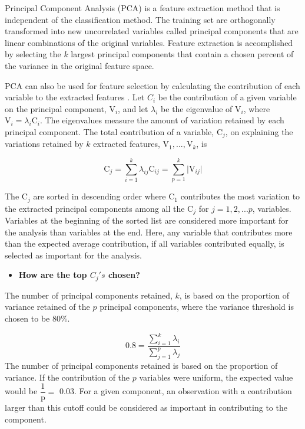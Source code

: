 \documentclass[12pt,]{article}
\providecommand{\tightlist}{%
  \setlength{\itemsep}{0pt}\setlength{\parskip}{0pt}}
\begin{document}
Principal Component Analysis (PCA) \autocite{f.r.s_liii._1901} is a
feature extraction method that is independent of the classification
method. The training set are orthogonally transformed into new
uncorrelated variables called principal components that are linear
combinations of the original variables. Feature extraction is
accomplished by selecting the \(k\) largest principal components that
contain a chosen percent of the variance in the original feature space.

PCA can also be used for feature selection by calculating the
contribution of each variable to the extracted features
\autocite{song_feature_2010}. Let \(C_i\) be the contribution of a given
variable on the principal component, \(\text{V}_i\), and let
\(\lambda_i\) be the eigenvalue of \(\text{V}_i\), where
\(\text{V}_{i} = \lambda_i \text{C}_i\). The eigenvalues measure the
amount of variation retained by each principal component. The total
contribution of a variable, \(\text{C}_j\), on explaining the variations
retained by \(k\) extracted features, \(\text{V}_1, ..., \text{V}_k\),
is

\[
\text{C}_j = \sum^k_{i=1}\lambda_{ij} \text{C}_{ij} = \sum^k_{p=1} \vert \text{V}_{ij} \vert 
\]

The \(\text{C}_j\) are sorted in descending order where \(\text{C}_1\)
contributes the most variation to the extracted principal components
among all the \(\text{C}_j\) for \(j=1,2,...p\), variables. Variables at
the beginning of the sorted list are considered more important for the
analysis than variables at the end. Here, any variable that contributes
more than the expected average contribution, if all variables
contributed equally, is selected as important for the analysis.

\begin{itemize}
\tightlist
\item
  \textbf{How are the top \(C_j's\) chosen?}
\end{itemize}

The number of principal components retained, \(k\), is based on the
proportion of variance retained of the \(p\) principal components, where
the variance threshold is chosen to be 80\%.

\[
0.8 = \frac{\sum^k_{i=1} \lambda_i}{\sum^p_{j=1} \lambda_j}
\] The number of principal components retained is based on the
proportion of variance. If the contribution of the \(p\) variables were
uniform, the expected value would be \(\dfrac{1}{\text{p}} =\) 0.03. For
a given component, an observation with a contribution larger than this
cutoff could be considered as important in contributing to the
component.
\end{document}
